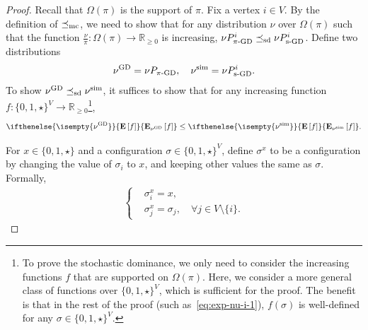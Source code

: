 \documentclass[11pt,a4paper]{article}
\newcommand{\mc}{\preceq_{\textnormal{mc}}}
\newcommand{\sd}{\preceq_{\textnormal{sd}}}
\newcommand{\psim}{P_{\textnormal{s-GD}}}
\theoremstyle{definition}
\newcommand{\nug}{\nu^{\textnormal{GD}}}
\newcommand{\nus}{\nu^{\textnormal{sim}}}
\newcommand{\E}[2][]{ \ifthenelse{\isempty{#1}}
  {\mathbf{\mathbf{E}}\left[#2\right]}
  {\mathbf{\mathbf{E}}_{#1}\left[#2\right]} }
\begin{document}
\begin{proof}
Recall that $\Omega(\pi)$ is the support of $\pi$.
Fix a vertex $i \in V$. 
By the definition of $\mc$, we need to show that for any distribution $\nu$ over $\Omega(\pi)$ such that the function $\frac{\nu}{\pi}:\Omega(\pi) \to \mathbb{R}_{\geq 0}$ is increasing, $\nu P^i_{\pi\textnormal{-GD}} \preceq_{\text{sd}} \nu \psim^i$. Define two distributions
\begin{align*}
\nug = \nu P_{\pi\textnormal{-GD}}, \quad \nus = \nu \psim^i.
\end{align*}
To show $\nug \sd \nus$, it suffices to show that for any increasing function $f:\{0,1,\star\}^V\to \mathbb{R}_{\geq 0}$\footnote{To prove the stochastic dominance, we only need to consider the increasing functions $f$ that are supported on $\Omega(\pi)$. Here, we consider a more general class of functions over $\{0,1,\star\}^V$, which is sufficient for the proof. The benefit is that in the rest of the proof (such as~\eqref{eq:exp-nu-i-1}), $f(\sigma)$ is well-defined for any $\sigma \in \{0,1,\star\}^V$.},
\begin{align}\label{eq:ineq-i-each}
    \E[\nug]{f}\leq \E[\nus]{f}.
\end{align}






For $x\in \{0,1,\star\}$ and a configuration $\sigma\in \{0,1,\star\}^V$, define $\sigma^x$ to be a configuration by changing the value of $\sigma_i$ to $x$, and keeping other values the same as $\sigma$. Formally,
\begin{align*}
    \begin{cases}
&\sigma^x_{i} = x,\\
&\sigma^x_j = \sigma_j,\quad \forall j\in V\setminus \{i\}.   
\end{cases}
\end{align*}






\end{proof}
\end{document}
